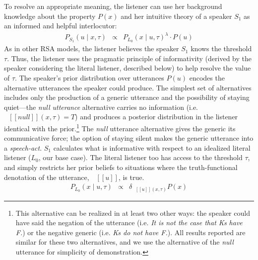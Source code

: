 \documentclass[12pt,letterpaper]{article}
\newcommand{\denote}[1]{\mbox{ $[\![ #1 ]\!]$}}
\begin{document}
To resolve an appropriate meaning, the listener can use her background knowledge about the property $P(x)$ and her intuitive theory of a speaker $S_1$ as an informed and helpful interlocutor:
\begin{eqnarray}
P_{S_{1}}(u \mid x, \tau) &\propto&  {P_{L_{0}}(x \mid u, \tau)}^{\lambda} \cdot P(u) \label{eq:S1}
\end{eqnarray}
%
As in other RSA models, the listener believes the speaker $S_1$ knows the threshold $\tau$.
Thus, the listener uses the pragmatic principle of informativity (derived by the speaker considering the literal listener, described below) to help resolve the value of $\tau$. 
The speaker's prior distribution over utterances $P(u)$ encodes the alternative utterances the speaker could produce. 
The simplest set of alternatives includes only the production of a generic utterance and the possibility of staying quiet---the \emph{null utterance} alternative carries no information (i.e.~$\denote{null}(x, \tau)=T$) and produces a posterior distribution in the listener identical with the prior.\footnote{
This alternative can be realized in at least two other ways: the speaker could have said the negation of the utterance (i.e. \emph{It is not the case that Ks have F.}) or the negative generic (i.e. \emph{Ks do not have F.}). All results reported are similar for these two alternatives, and we use the alternative of the \emph{null} utterance for simplicity of demonstration.
}
The \emph{null} utterance alternative gives the generic its communicative force; the option of staying silent makes the generic utterance into a \emph{speech-act}.
%
%
%
$S_1$ calculates what is informative with respect to an idealized literal listener ($L_{0}$, our base case).
The literal listener too has access to the threshold $\tau$, and simply restricts her prior beliefs to situations where the truth-functional denotation of the utterance, $\denote{u}$, is true.
%
\begin{eqnarray}
P_{L_{0}}(x \mid u, \tau) &\propto& {\delta_{\denote{u}(x, \tau)} P(x)} \label{eq:L0}
\end{eqnarray}
%
\end{document}
